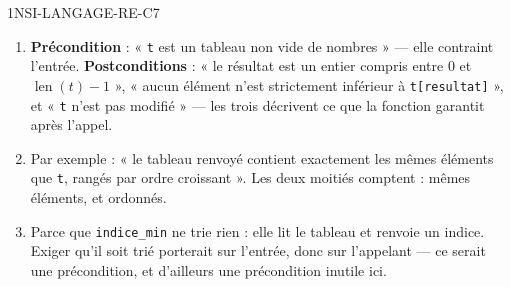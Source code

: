 \begin{corrige}{1NSI-LANGAGE-RE-C7}
\begin{enumerate}
  \item \textbf{Précondition} : « \lstinline{t} est un tableau non vide de nombres » — elle
        contraint l'entrée.
        \textbf{Postconditions} : « le résultat est un entier compris entre $0$ et
        $\operatorname{len}(t)-1$ », « aucun élément n'est strictement inférieur à
        \lstinline{t[resultat]} », et « \lstinline{t} n'est pas modifié » — les trois décrivent
        ce que la fonction garantit après l'appel.
  \item Par exemple : « le tableau renvoyé contient exactement les mêmes éléments que
        \lstinline{t}, rangés par ordre croissant ». Les deux moitiés comptent : mêmes
        éléments, et ordonnés.
  \item Parce que \lstinline{indice_min} ne trie rien : elle lit le tableau et renvoie un
        indice. Exiger qu'il soit trié porterait sur l'entrée, donc sur l'appelant — ce serait
        une précondition, et d'ailleurs une précondition inutile ici.
\end{enumerate}
\end{corrige}
